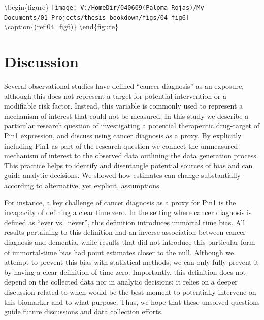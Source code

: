 \documentclass[
]{book}
\begin{document}
\textbackslash begin\{figure\}
\texttt{[image: V:/HomeDir/040609(Paloma Rojas)/My Documents/01\_Projects/thesis\_bookdown/figs/04\_fig6]} \textbackslash caption\{(ref:04\_fig6)\}\label{fig:unnamed-chunk-6}
\textbackslash end\{figure\}

\hypertarget{discussion-2}{%
\section{Discussion}\label{discussion-2}}

Several observational studies have defined ``cancer diagnosis'' as an exposure, although this does not represent a target for potential intervention or a modifiable risk factor. Instead, this variable is commonly used to represent a mechanism of interest that could not be measured. In this study we describe a particular research question of investigating a potential therapeutic drug-target of Pin1 expression, and discuss using cancer diagnosis as a proxy. By explicitly including Pin1 as part of the research question we connect the unmeasured mechanism of interest to the observed data outlining the data generation process. This practice helps to identify and disentangle potential sources of bias and can guide analytic decisions. We showed how estimates can change substantially according to alternative, yet explicit, assumptions.

For instance, a key challenge of cancer diagnosis as a proxy for Pin1 is the incapacity of defining a clear time zero\autocite{hernan2016}. In the setting where cancer diagnosis is defined as ``ever vs.~never'', this definition introduces immortal time bias. All results pertaining to this definition had an inverse association between cancer diagnosis and dementia, while results that did not introduce this particular form of immortal-time bias had point estimates closer to the null. Although we attempt to prevent this bias with statistical methods, we can only fully prevent it by having a clear definition of time-zero. Importantly, this definition does not depend on the collected data nor in analytic decisions: it relies on a deeper discussion related to when would be the best moment to potentially intervene on this biomarker and to what purpose. Thus, we hope that these unsolved questions guide future discussions and data collection efforts.
\end{document}
